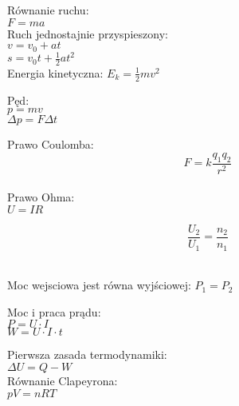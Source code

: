 \documentclass[a4paper,10pt]{article}
\begin{document}
\pagestyle{empty} %

\begin{multicols}{2}

\begin{tcolorbox}[title=\textbf{Mechanika}, colframe=pastelblue, colback=white]
Równanie ruchu: \\
$F = ma$\\[6pt]
Ruch jednostajnie przyspieszony: \\
$v = v_0 + at$\\
$s = v_0t + \frac{1}{2}at^2$\\[6pt]
Energia kinetyczna: $E_k = \frac{1}{2}mv^2$

Pęd:\\
$p = m v$\\
$\Delta p = F \Delta t$
\end{tcolorbox}



\begin{tcolorbox}[title=\textbf{Elektryczność}, colframe=pastelpink, colback=white]
Prawo Coulomba: \\
$$F = k \frac{q_1 q_2}{r^2}$$\\[6pt]
Prawo Ohma: \\
$U = IR$ \\
\begin{multicols}{2}
  \centering
  
  
  \columnbreak
  
  \centering
  $$\frac{U_2}{U_1} = \frac{n_2}{n_1}$$\\ \vspace{0.15cm}
  
  Moc wejsciowa jest równa wyjściowej: $P_1 = P_2$
\end{multicols}

Moc i praca prądu:\\
$P = U\cdot I$\\ 
$W = U\cdot I\cdot t$


\end{tcolorbox}

\begin{tcolorbox}[title=\textbf{Termodynamika}, colframe=pastelgreen, colback=white]
Pierwsza zasada termodynamiki: \\
$\Delta U = Q - W$\\[6pt]
Równanie Clapeyrona: \\
$pV = nRT$
\end{tcolorbox}


\end{multicols}
\end{document}
